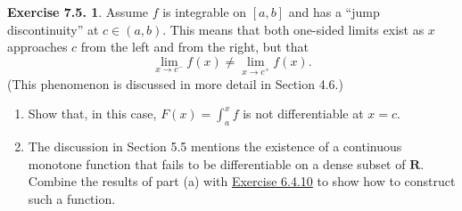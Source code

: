 \documentclass[12pt]{article}
\theoremstyle{definition}
\theoremstyle{exercise}
\newtheorem{exercise}{Exercise 7.5.}
\theoremstyle{solution}
\newcommand{\R}{\mathbf{R}}
\begin{document}
\begin{exercise}
\label{ex:11}
    Assume \( f \) is integrable on \( [a, b] \) and has a ``jump discontinuity'' at \( c \in (a, b) \). This means that both one-sided limits exist as \( x \) approaches \( c \) from the left and from the right, but that
    \[
        \lim_{x \to c^-} f(x) \neq \lim_{x \to c^+} f(x).
    \]
    (This phenomenon is discussed in more detail in Section 4.6.)
    \begin{enumerate}
        \item Show that, in this case, \( F(x) = \int_a^x f \) is not differentiable at \( x = c \).

        \item The discussion in Section 5.5 mentions the existence of a continuous monotone function that fails to be differentiable on a dense subset of \( \R \). Combine the results of part (a) with \href{https://lew98.github.io/Mathematics/UA_Section_6_4_Exercises.pdf}{Exercise 6.4.10} to show how to construct such a function.
    \end{enumerate}
\end{exercise}
\end{document}
